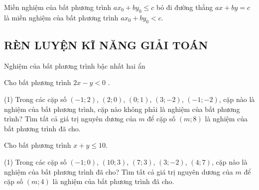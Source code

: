 \begin{note}
	Miền nghiệm của bất phương trình $ax_0+by_0\leq c$ bỏ đi đường thẳng $ax+by=c$ là miền nghiệm của bất phương trình $ax_0+by_0<c$.
\end{note}
	
\subsection{RÈN LUYỆN KĨ NĂNG GIẢI TOÁN}
\begin{dang}{Nghiệm của bất phương trình bậc nhất hai ẩn}	
\end{dang}
\begin{vd}%
	Cho bất phương trình $2x-y<0$ . 
	\begin{tasks}(1)
		\task Trong các cặp số $(-1;2)$, $\left(2;0\right)$, $(0;1)$, $\left(3;-2\right)$, $(-1;-2)$, cặp nào là nghiệm của bất phương trình, cặp nào không phải là nghiệm của bất phương trình?
		\task Tìm tất cả giá trị nguyên dương của $m$ để cặp số $(m;8)$ là nghiệm của bất phương trình đã cho. 
	\end{tasks}
\end{vd}

\begin{vd}
	Cho bất phương trình $x+y \le 10$. 
	\begin{tasks}(1)
		\task  Trong các cặp số $(-1;0)$, $\left(10;3\right)$, $(7;3)$, $\left(3;-2\right)$, $(4;7)$, cặp nào là nghiệm của bất phương trình đã cho?
		\task Tìm tất cả giá trị nguyên dương của $m$ để cặp số $(m;4)$ là nghiệm của bất phương trình đã cho.
	\end{tasks}
\end{vd}

